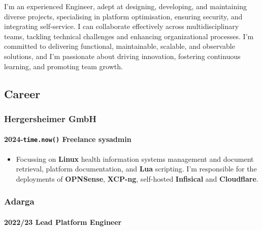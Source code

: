 \documentclass[
]{article}
\providecommand{\tightlist}{%
  \setlength{\itemsep}{0pt}\setlength{\parskip}{0pt}}
\begin{document}
I'm an experienced Engineer, adept at designing, developing, and
maintaining diverse projects, specialising in platform optimisation,
ensuring security, and integrating self-service. I can collaborate
effectively across multidisciplinary teams, tackling technical
challenges and enhancing organizational processes. I'm committed to
delivering functional, maintainable, scalable, and observable solutions,
and I'm passionate about driving innovation, fostering continuous
learning, and promoting team growth.

\hypertarget{material-briefcase-career}{%
\subsection{\texorpdfstring{\faBriefcase
Career}{ Career}}\label{material-briefcase-career}}

\hypertarget{material-office-building-hergersheimer-gmbh}{%
\subsubsection{\texorpdfstring{\faBuilding Hergersheimer
GmbH}{ Hergersheimer GmbH}}\label{material-office-building-hergersheimer-gmbh}}

\hypertarget{time.now-freelance-sysadmin}{%
\paragraph{\texorpdfstring{2024-\texttt{time.now()} Freelance
sysadmin}{2024-time.now() Freelance sysadmin}}\label{time.now-freelance-sysadmin}}

\begin{itemize}
\tightlist
\item
  Focussing on \textbf{Linux} health information systems management and
  document retrieval, platform documentation, and \textbf{Lua}
  scripting. I'm responsible for the deployments of \textbf{OPNSense},
  \textbf{XCP-ng}, self-hosted \textbf{Infisical} and
  \textbf{Cloudflare}.
\end{itemize}

\hypertarget{material-office-building-adarga}{%
\subsubsection{\texorpdfstring{\faBuilding
Adarga}{ Adarga}}\label{material-office-building-adarga}}

\hypertarget{lead-platform-engineer}{%
\paragraph{2022/23 Lead Platform
Engineer}\label{lead-platform-engineer}}
\end{document}
